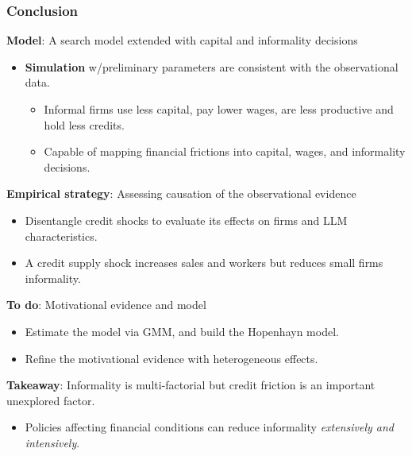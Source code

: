 \documentclass[aspectratio=169]{beamer} %
\begin{document}

\begin{frame}
\frametitle{\textbf{Conclusion}}

\textbf{Model}: A search model extended with capital and informality decisions
\begin{itemize}
    \item \textbf{Simulation} w/preliminary parameters are consistent with the observational data.
    \begin{itemize}
        \item Informal firms use less capital, pay lower wages, are less productive and hold less credits.
        \item Capable of mapping financial frictions into capital, wages, and informality decisions.
    \end{itemize} 
\end{itemize}

\pause
\vspace{5mm}

\textbf{Empirical strategy}: Assessing causation of the observational evidence
\begin{itemize}
    \item Disentangle credit shocks to evaluate its effects on firms and LLM characteristics.
    \item A credit supply shock increases sales and workers but reduces small firms informality. 
\end{itemize}

\pause
\vspace{5mm}

\textbf{To do}: Motivational evidence and model
\begin{itemize}
    \item Estimate the model via GMM, and build the Hopenhayn model.
    \item Refine the motivational evidence with heterogeneous effects.
\end{itemize}

\pause
\vspace{5mm}

\textbf{Takeaway}: Informality is multi-factorial but credit friction is an important unexplored factor.
\begin{itemize}
    \item Policies affecting financial conditions can reduce informality \textit{extensively and intensively}.
\end{itemize}

\end{frame}
\end{document}
